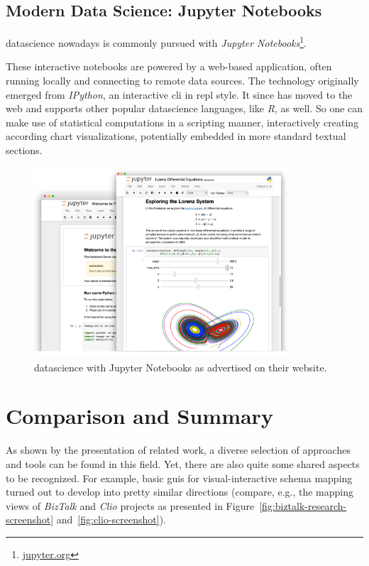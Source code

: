 \subsection{Modern Data Science: Jupyter Notebooks}

\Gls{datascience} nowadays is commonly pursued with \emph{Jupyter Notebooks}\footnote{\textcolor{blue}{\href{https://jupyter.org/}{jupyter.org}}}.

These interactive notebooks are powered by a web-based application, often running locally and connecting to remote data sources.
The technology originally emerged from \emph{IPython}, an interactive \gls{cli} in \gls{repl} style.
It since has moved to the web and supports other popular \gls{datascience} languages, like \emph{R}, as well.
So one can make use of statistical computations in a scripting manner, interactively creating according chart visualizations, potentially embedded in more standard textual sections.

\begin{figure}[h]
  \centering
  \includegraphics[width=0.85\textwidth]{figures/state-of-the-art/jupyter-notebooks}
  \caption{\Gls{datascience} with Jupyter Notebooks as advertised on their website.}
  \label{fig:jupyter-notebooks}
\end{figure}


\section{Comparison and Summary}

As shown by the presentation of related work, a diverse selection of approaches and tools can be found in this field. Yet, there are also quite some shared aspects to be recognized. For example, basic \gls{gui}s for visual-interactive schema mapping turned out to develop into pretty similar directions (compare, e.g., the mapping views of \emph{BizTalk} and \emph{Clio} projects as presented in Figure~\ref{fig:biztalk-research-screenshot} and~\ref{fig:clio-screenshot}).


